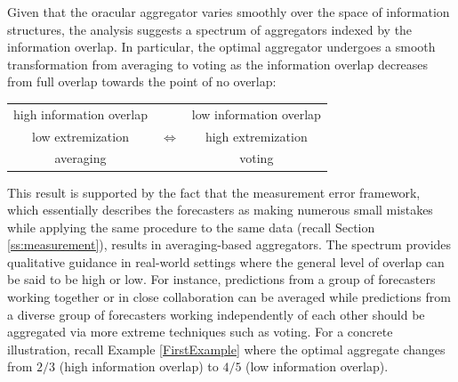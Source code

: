 \documentclass[12pt]{article}
\theoremstyle{definition}
\theoremstyle{definition}
\begin{document}
Given that the oracular aggregator varies
smoothly over the space of information structures, the analysis suggests a spectrum of aggregators indexed by
the information overlap.
In particular, the optimal aggregator undergoes a smooth
transformation from averaging to voting as
the information overlap decreases from full overlap towards the point
of no overlap:
\begin{center}
\singlespacing
\vspace{-1em}
\begin{tabular}{ccc}
high information overlap & & low information overlap\\
low extremization & {\Large $\Longleftrightarrow$} & high extremization \\
averaging  & & voting
\end{tabular}
\end{center}
This result is supported by the fact that the
measurement error framework, which essentially describes the
forecasters as making numerous small mistakes while applying the same
procedure to the same data (recall Section \ref{ss:measurement}),
results in averaging-based aggregators.
The spectrum provides qualitative guidance in real-world settings
where the general level of overlap can be said to be high or low.  For
instance, predictions from a group of forecasters working together or in
close collaboration can be averaged while predictions from a diverse
group of forecasters working independently of each other should be
aggregated via more extreme techniques such as voting. For a concrete illustration, recall  Example \ref{FirstExample} where the optimal aggregate changes from $2/3$ (high information overlap) to $4/5$ (low information overlap). 

\end{document}
